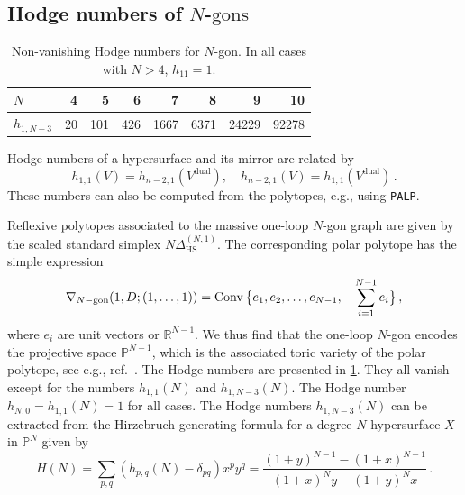 \documentclass[12pt,a4paper]{article}
\theoremstyle{plain}
\theoremstyle{remark}
\newcommand{\nprops}{N}
\newcommand{\Conv}{\operatorname{Conv}}
\newcommand{\Newton}{\Delta}
\newcommand{\simplexwithpars}[1]{\Newton_{\text{HS}}^{(#1)}}
\begin{document}
	\subsection{Hodge  numbers of $\nprops$-$\textrm{gons}$}\label{sec:Hodgenumbers}
    \begin{table}[tb]
			\centering
			\setlength{\tabcolsep}{1em}
			\begin{tabular}{@{}lrrrrrrr@{}}
                          $N$   &4 & 5 &6 &7 &8 &9&10  \\
                    				\midrule
				$h_{1,N-3}$  &20 & 101&426 &1667 &6371 & 24229& 92278\\
			\end{tabular}
			\caption{Non-vanishing Hodge numbers for $N$-gon. In all cases with $N>4$, $h_{11}=1$.}
			\label{Hodgengon}
		\end{table} 
		
Hodge numbers of a hypersurface and its mirror are  related by \cite{Batyrev:1993oya}
\begin{equation}
h_{1,1}(V)=h_{n-2,1}(V^{\mathrm{dual}}), \quad
h_{n-2,1}(V)=h_{1,1}(V^{\mathrm{dual}}) \,.
\end{equation}
These numbers can also be computed from the polytopes, e.g., using \texttt{PALP}.	

Reflexive polytopes associated to the massive one-loop $\nprops$-gon graph are given by the scaled standard simplex $\nprops \simplexwithpars{\nprops,1}$.
        The corresponding polar polytope has the simple expression
		\begin{equation}
			\nabla_{\nprops-\rm
                          gon}(1,D;(1,\dots,1))=\Conv\big\{
			e_1,e_2, \dots, e_{\nprops-1}, -\sum_{i=1}^{\nprops-1} e_i
			\big\}	\, , 
		\end{equation}
		where $e_i$ are unit vectors or $\mathbb R^{\nprops-1}$. We
                thus find that the one-loop $\nprops$-gon encodes the
                projective space $\mathbb{P}^{\nprops-1}$, which is the
                associated toric variety of the polar polytope, see e.g., ref.~\cite[Chapter 1]{Fulton93}.
                The
Hodge numbers are presented in \cref{Hodgengon}.
                They all vanish except for the numbers
                $h_{1,1}(\nprops)$ and $h_{1,N-3}(\nprops)$. The Hodge
                number $h_{\nprops,0}=h_{1,1}(\nprops)=1$  for all cases.
		The Hodge numbers $h_{1,N-3}(\nprops)$ can be extracted
                from the Hirzebruch generating formula for a degree
                $\nprops$ hypersurface $X$ in  $\mathbb{P}^{\nprops}$ given by~\cite[Theorem~17.3.4]{Arapura2012}
		\begin{equation}
			H(\nprops)=\sum_{p,q}(h_{p,q}(\nprops)-\delta_{pq}) x^p y^q=\frac{(1+y)^{\nprops-1}-(1+x)^{\nprops-1}}{(1+x)^{\nprops }y-(1+y)^{\nprops }x}\,.
			\label{formal-series-Hd}
                      \end{equation}
\end{document}
